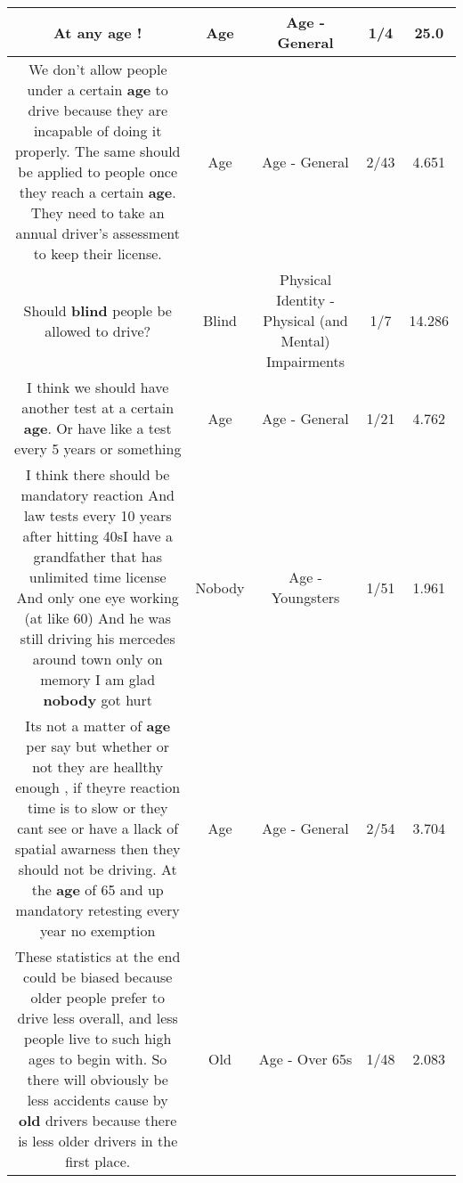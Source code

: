 \documentclass[11pt]{article}
\newlength\mylength
\begin{document}
\begin{center}
\begin{longtable}{|C{.65\mylength}|C{.30\mylength}|C{.12\mylength}|C{.12\mylength}|C{.12\mylength}|}
  \small At any \textbf{age} !\normalsize   & Age & Age - General & 1/4 & 25.0 \\  \hline
  \small We don't allow people under a certain \textbf{age} to drive because they are incapable of doing it properly.  The same should be applied to people once they reach a certain \textbf{age}.  They need to take an annual driver's assessment to keep their license.\normalsize   & Age & Age - General & 2/43 & 4.651 \\  \hline
  \small Should \textbf{blind} people be allowed to drive?\normalsize   & Blind & Physical Identity - Physical (and Mental) Impairments & 1/7 & 14.286 \\  \hline
  \small I think we should have another test at a certain \textbf{age}. Or have like a test every 5 years or something\normalsize   & Age & Age - General & 1/21 & 4.762 \\  \hline
  \small I think there should be mandatory reaction And law tests every 10 years after hitting 40sI have a grandfather that has unlimited time license And only one eye working (at like 60) And he was still driving his mercedes around town only on memory I am glad \textbf{nobody} got hurt\normalsize   & Nobody & Age - Youngsters & 1/51 & 1.961 \\  \hline
  \small Its not a matter of \textbf{age} per say but whether or not they are heallthy enough , if theyre reaction time is to slow or they cant see or have a llack of spatial awarness then they should not be driving. At the \textbf{age} of 65 and up mandatory retesting every year no exemption\normalsize   & Age & Age - General & 2/54 & 3.704 \\  \hline
  \small These statistics at the end could be biased because older people prefer to drive less overall, and less people live to such high ages to begin with. So there will obviously be less accidents cause by \textbf{old} drivers because there is less older drivers in the first place.\normalsize   & Old & Age - Over 65s & 1/48 & 2.083 \\  \hline

\end{longtable}
\end{center}
\end{document}
